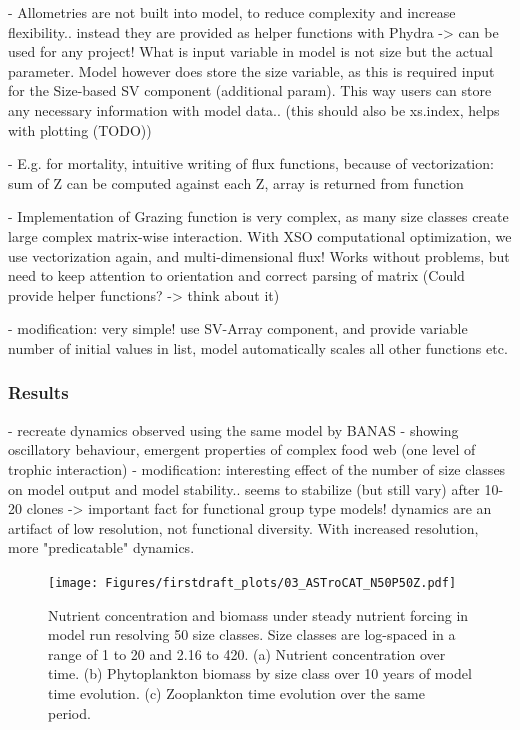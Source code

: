 \documentclass[journal abbreviation, manuscript]{copernicus}
\begin{document}
- Allometries are not built into model, to reduce complexity and increase flexibility.. instead they are provided as helper functions with Phydra -> can be used for any project! What is input variable in model is not size but the actual parameter. Model however does store the size variable, as this is required input for the Size-based SV component (additional param). This way users can store any necessary information with model data.. (this should also be xs.index, helps with plotting (TODO))

- E.g. for mortality, intuitive writing of flux functions, because of vectorization: sum of Z can be computed against each Z, array is returned from function

- Implementation of Grazing function is very complex, as many size classes create large complex matrix-wise interaction. With XSO computational optimization, we use vectorization again, and multi-dimensional flux! Works without problems, but need to keep attention to orientation and correct parsing of matrix (Could provide helper functions? -> think about it)

- modification: very simple! use SV-Array component, and provide variable number of initial values in list, model automatically scales all other functions etc.


\subsubsection{Results}
- recreate dynamics observed using the same model by BANAS
- showing oscillatory behaviour, emergent properties of complex food web (one level of trophic interaction)
- modification: interesting effect of the number of size classes on model output and model stability.. seems to stabilize (but still vary) after 10-20 clones -> important fact for functional group type models! dynamics are an artifact of low resolution, not functional diversity. With increased resolution, more "predicatable" dynamics.


\begin{figure}[t]
\texttt{[image: Figures/firstdraft\_plots/03\_ASTroCAT\_N50P50Z.pdf]}
\caption{Nutrient concentration and biomass under steady nutrient forcing in model run resolving 50 size classes. Size classes are log-spaced in a range of 1 to 20 and 2.16 to 420. (a) Nutrient concentration over time. (b) Phytoplankton biomass by size class over 10 years of model time evolution. (c) Zooplankton time evolution over the same period.}
\label{Figure:ResultsASTroCAT_1}
\end{figure}
\end{document}
